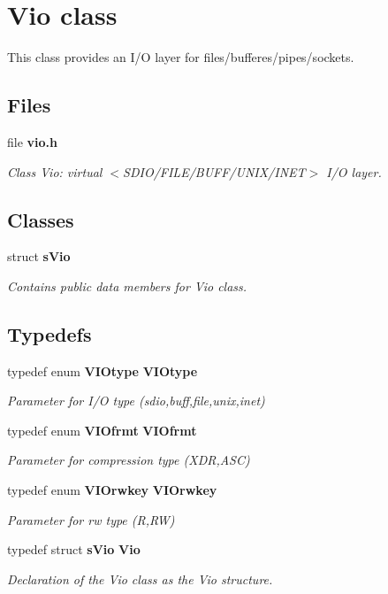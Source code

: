 \section{Vio class}
\label{a00028}


This class provides an I/\-O layer for files/bufferes/pipes/sockets.  


\subsection*{Files}
\begin{DoxyCompactItemize}
\item 
file {\bf vio.\-h}
\begin{DoxyCompactList}\small\item\em Class Vio\-: virtual $<$S\-D\-I\-O/\-F\-I\-L\-E/\-B\-U\-F\-F/\-U\-N\-I\-X/\-I\-N\-E\-T$>$ I/\-O layer. \end{DoxyCompactList}\end{DoxyCompactItemize}
\subsection*{Classes}
\begin{DoxyCompactItemize}
\item 
struct {\bf s\-Vio}
\begin{DoxyCompactList}\small\item\em Contains public data members for Vio class. \end{DoxyCompactList}\end{DoxyCompactItemize}
\subsection*{Typedefs}
\begin{DoxyCompactItemize}
\item 
typedef enum {\bf V\-I\-Otype} {\bf V\-I\-Otype}
\begin{DoxyCompactList}\small\item\em Parameter for I/\-O type (sdio,buff,file,unix,inet) \end{DoxyCompactList}\item 
typedef enum {\bf V\-I\-Ofrmt} {\bf V\-I\-Ofrmt}
\begin{DoxyCompactList}\small\item\em Parameter for compression type (X\-D\-R,A\-S\-C) \end{DoxyCompactList}\item 
typedef enum {\bf V\-I\-Orwkey} {\bf V\-I\-Orwkey}
\begin{DoxyCompactList}\small\item\em Parameter for rw type (R,R\-W) \end{DoxyCompactList}\item 
typedef struct {\bf s\-Vio} {\bf Vio}
\begin{DoxyCompactList}\small\item\em Declaration of the Vio class as the Vio structure. \end{DoxyCompactList}\end{DoxyCompactItemize}
